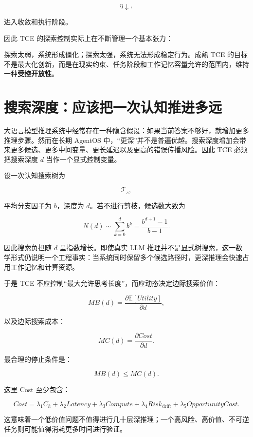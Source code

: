 \[
\eta\downarrow,
\]

进入收敛和执行阶段。

因此 TCE 的探索控制实际上在不断管理一个基本张力：

\begin{statementbox}
\centering
{}
\end{statementbox}

探索太弱，系统形成僵化；探索太强，系统无法形成稳定行为。成熟 TCE 的目标不是最大化创新，而是在现实约束、任务阶段和工作记忆容量允许的范围内，维持一种\textbf{受控开放性}。

\section{搜索深度：应该把一次认知推进多远}

大语言模型推理系统中经常存在一种隐含假设：如果当前答案不够好，就增加更多推理步骤。然而在长期 AgentOS 中，“更深”并不是普遍优越。搜索深度增加会带来更多候选、更多中间变量、更长延迟以及更高的错误传播风险。因此 TCE 必须把搜索深度 $d$ 当作一个显式控制变量。

设一次认知搜索树为

\[
\mathcal T_s,
\]

平均分支因子为 $b$，深度为 $d$。若不进行剪枝，候选数大致为

\[
N(d)
\sim
\sum_{k=0}^{d}b^k
=
\frac{b^{d+1}-1}{b-1}.
\]

因此搜索负担随 $d$ 呈指数增长。即使真实 LLM 推理并不是显式树搜索，这一数学形式仍说明一个工程事实：当系统同时保留多个候选路径时，更深推理会快速占用工作记忆和计算资源。

于是 TCE 不应控制“最大允许思考长度”，而应动态决定边际搜索价值：

\[
MB(d)
=
\frac{
\partial \mathbb E[Utility]
}{
\partial d
},
\]

以及边际搜索成本：

\[
MC(d)
=
\frac{
\partial Cost
}{
\partial d
}.
\]

最合理的停止条件是：

\[
MB(d)
\le
MC(d).
\]

这里 Cost 至少包含：

\[
Cost
=
\lambda_1C_h
+
\lambda_2Latency
+
\lambda_3Compute
+
\lambda_4Risk_{\mathrm{drift}}
+
\lambda_5OpportunityCost.
\]

这意味着一个低价值问题不值得进行几十层深推理；一个高风险、高价值、不可逆任务则可能值得消耗更多时间进行验证。

